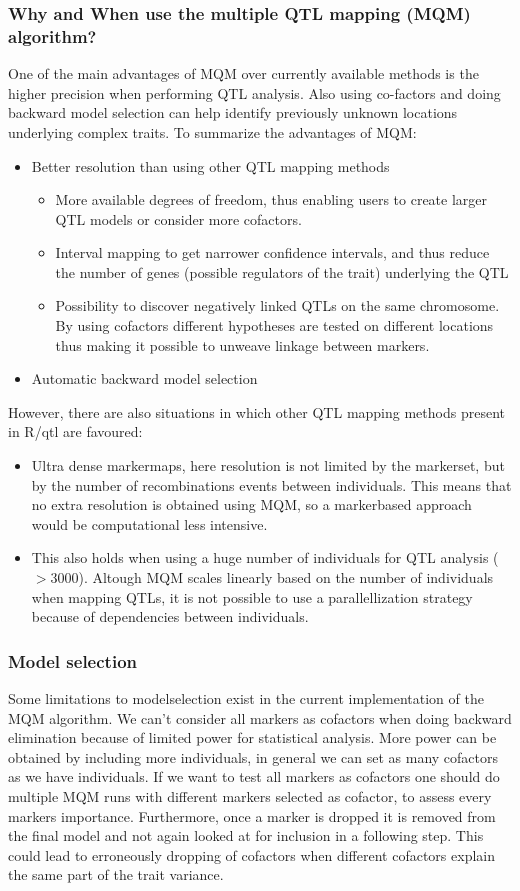 \subsubsection*{Why and When use the multiple QTL mapping (MQM) algorithm?}
One of the main advantages of MQM over currently available methods is the higher precision when performing QTL analysis.
Also using co-factors and doing backward model selection can help identify previously unknown locations underlying
complex traits. To summarize the advantages of MQM:
\begin{itemize}
\item Better resolution than using other QTL mapping methods
	\begin{itemize}
	\item More available degrees of freedom, thus enabling users to create larger QTL models or 
	consider more cofactors.
	\item Interval mapping to get narrower confidence intervals, and thus reduce the number of genes 
	(possible regulators of the trait) underlying the QTL 
	\item Possibility to discover negatively linked QTLs on the same chromosome. By using cofactors 
	different hypotheses are tested on different locations thus making it possible to unweave linkage between markers.
	\end{itemize}
\item Automatic backward model selection
\end{itemize}
However, there are also situations in which other QTL mapping methods present in  R/qtl are favoured:
\begin{itemize}
\item Ultra dense markermaps, here resolution is not limited by the markerset, but by the number of recombinations events between individuals. 
This means that no extra resolution is obtained using MQM, so a markerbased approach would be computational less intensive. 
\item This also holds when using a huge number of individuals for QTL analysis ($>3000$). Altough MQM scales 
linearly based on the number of individuals when mapping QTLs, it is not possible to use a parallellization strategy because of 
dependencies between individuals.
\end{itemize}
\subsubsection*{Model selection}
Some limitations to modelselection exist in the current implementation of the MQM algorithm. We can't consider all markers as cofactors 
when doing backward elimination because of limited power for statistical analysis. More power can be obtained by including more individuals, 
in general we can set as many cofactors as we have individuals. If we want to test all markers as cofactors one should do multiple MQM runs with
different markers selected as cofactor, to assess every markers importance. Furthermore, once a marker is dropped it is removed from the final model and not again looked at for inclusion in a following step. This could lead to erroneously dropping of cofactors when different cofactors explain the same part of the trait variance.

